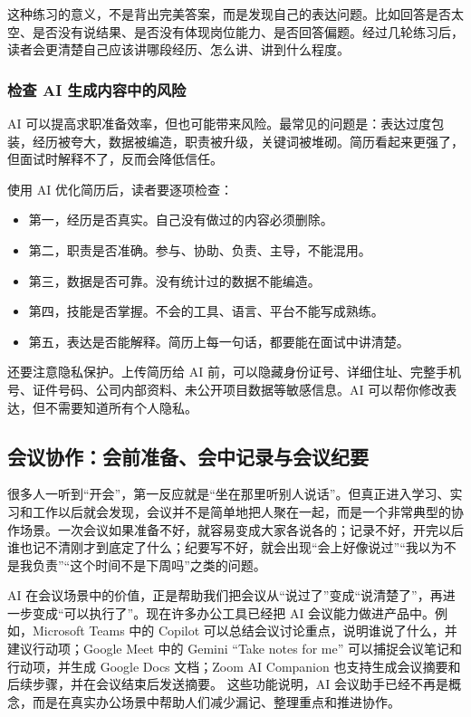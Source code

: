 这种练习的意义，不是背出完美答案，而是发现自己的表达问题。比如回答是否太空、是否没有说结果、是否没有体现岗位能力、是否回答偏题。经过几轮练习后，读者会更清楚自己应该讲哪段经历、怎么讲、讲到什么程度。

\subsubsection*{检查 AI 生成内容中的风险}

AI 可以提高求职准备效率，但也可能带来风险。最常见的问题是：表达过度包装，经历被夸大，数据被编造，职责被升级，关键词被堆砌。简历看起来更强了，但面试时解释不了，反而会降低信任。

使用 AI 优化简历后，读者要逐项检查：
\begin{itemize}
    \item 第一，经历是否真实。自己没有做过的内容必须删除。
    \item 第二，职责是否准确。参与、协助、负责、主导，不能混用。
    \item 第三，数据是否可靠。没有统计过的数据不能编造。
    \item 第四，技能是否掌握。不会的工具、语言、平台不能写成熟练。
    \item 第五，表达是否能解释。简历上每一句话，都要能在面试中讲清楚。
\end{itemize}

还要注意隐私保护。上传简历给 AI 前，可以隐藏身份证号、详细住址、完整手机号、证件号码、公司内部资料、未公开项目数据等敏感信息。AI 可以帮你修改表达，但不需要知道所有个人隐私。




\subsection{会议协作：会前准备、会中记录与会议纪要}

很多人一听到“开会”，第一反应就是“坐在那里听别人说话”。但真正进入学习、实习和工作以后就会发现，会议并不是简单地把人聚在一起，而是一个非常典型的协作场景。一次会议如果准备不好，就容易变成大家各说各的；记录不好，开完以后谁也记不清刚才到底定了什么；纪要写不好，就会出现“会上好像说过”“我以为不是我负责”“这个时间不是下周吗”之类的问题。

AI 在会议场景中的价值，正是帮助我们把会议从“说过了”变成“说清楚了”，再进一步变成“可以执行了”。现在许多办公工具已经把 AI 会议能力做进产品中。例如，Microsoft Teams 中的 Copilot 可以总结会议讨论重点，说明谁说了什么，并建议行动项；Google Meet 中的 Gemini “Take notes for me” 可以捕捉会议笔记和行动项，并生成 Google Docs 文档；Zoom AI Companion 也支持生成会议摘要和后续步骤，并在会议结束后发送摘要。 这些功能说明，AI 会议助手已经不再是概念，而是在真实办公场景中帮助人们减少漏记、整理重点和推进协作。


